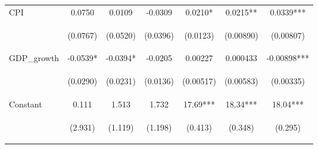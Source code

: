 \documentclass[]{article}
\begin{document}
\begin{center}
\begin{tabular}{lcccccc}
CPI & 0.0750 & 0.0109 & -0.0309 & 0.0210* & 0.0215** & 0.0339*** \\
\vspace{4pt} & \begin{footnotesize}(0.0767)\end{footnotesize} & \begin{footnotesize}(0.0520)\end{footnotesize} & \begin{footnotesize}(0.0396)\end{footnotesize} & \begin{footnotesize}(0.0123)\end{footnotesize} & \begin{footnotesize}(0.00890)\end{footnotesize} & \begin{footnotesize}(0.00807)\end{footnotesize} \\
GDP\_growth & -0.0539* & -0.0394* & -0.0205 & 0.00227 & 0.000433 & -0.00898*** \\
\vspace{4pt} & \begin{footnotesize}(0.0290)\end{footnotesize} & \begin{footnotesize}(0.0231)\end{footnotesize} & \begin{footnotesize}(0.0136)\end{footnotesize} & \begin{footnotesize}(0.00517)\end{footnotesize} & \begin{footnotesize}(0.00583)\end{footnotesize} & \begin{footnotesize}(0.00335)\end{footnotesize} \\
Constant & 0.111 & 1.513 & 1.732 & 17.69*** & 18.34*** & 18.04*** \\
 & \begin{footnotesize}(2.931)\end{footnotesize} & \begin{footnotesize}(1.119)\end{footnotesize} & \begin{footnotesize}(1.198)\end{footnotesize} & \begin{footnotesize}(0.413)\end{footnotesize} & \begin{footnotesize}(0.348)\end{footnotesize} & \begin{footnotesize}(0.295)\end{footnotesize} \\

\end{tabular}
\end{center}
\end{document}
